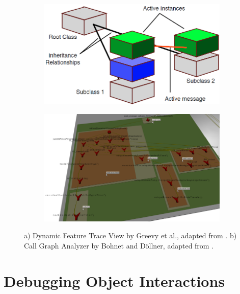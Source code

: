 \begin{figure}[tb]
	\centering
	
	\begin{subfigure}[b]{0.45\textwidth}
		\centering
        \includegraphics[width=\textwidth]{../images/06-Greevy-3D}
        \caption[Dynamic Feature Trace View by Greevy et al.]{}
		\label{fig:3DGreevy}
	\end{subfigure}
	\quad
	\begin{subfigure}[b]{0.45\textwidth}
		\centering
		\includegraphics[width=\textwidth]{../images/06-Bohnet-3D}
		\caption[foo]{}
		\label{fig:3DBohnet}
	\end{subfigure}
	
	\caption[TOC Caption]{
		a) Dynamic Feature Trace View by Greevy et al., adapted from \cite{greevy_visualizing_2006}.
		b) Call Graph Analyzer by Bohnet and Döllner, adapted from \cite{bohnet_visual_2006}.
	}
\end{figure}

\section{Debugging Object Interactions}

